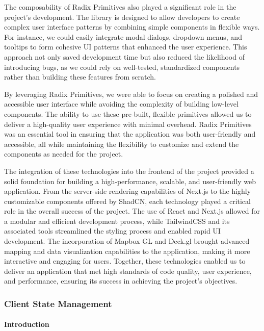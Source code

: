 \begin{enumerate}
    The composability of Radix Primitives also played a significant role in the project's development. The library is designed to allow developers to create complex user interface patterns by combining simple components in flexible ways. For instance, we could easily integrate modal dialogs, dropdown menus, and tooltips to form cohesive UI patterns that enhanced the user experience. This approach not only saved development time but also reduced the likelihood of introducing bugs, as we could rely on well{-}tested, standardized components rather than building these features from scratch.

    By leveraging Radix Primitives, we were able to focus on creating a polished and accessible user interface while avoiding the complexity of building low{-}level components. The ability to use these pre{-}built, flexible primitives allowed us to deliver a high{-}quality user experience with minimal overhead. Radix Primitives was an essential tool in ensuring that the application was both user{-}friendly and accessible, all while maintaining the flexibility to customize and extend the components as needed for the project.


\end{enumerate}

The integration of these technologies into the frontend of the project provided a solid foundation for building a high{-}performance, scalable, and user{-}friendly web application. From the server{-}side rendering capabilities of Next.js to the highly customizable components offered by ShadCN, each technology played a critical role in the overall success of the project. The use of React and Next.js allowed for a modular and efficient development process, while TailwindCSS and its associated tools streamlined the styling process and enabled rapid UI development. The incorporation of Mapbox GL and Deck.gl brought advanced mapping and data visualization capabilities to the application, making it more interactive and engaging for users. Together, these technologies enabled us to deliver an application that met high standards of code quality, user experience, and performance, ensuring its success in achieving the project’s objectives.

\subsubsection{Client State Management}
    \paragraph{Introduction}\mbox{}


